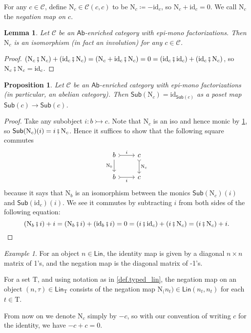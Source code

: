 \documentclass[11pt, oneside, article]{memoir}
\theoremstyle{plain}
\newtheorem{proposition}[theorem]{Proposition}
\newtheorem{lemma}[theorem]{Lemma}
\theoremstyle{definition}
\theoremstyle{remark}
\newtheorem{example}[theorem]{Example}
\newcommand{\Set}[1]{\mathrm{#1}}%
\newcommand{\cat}[1]{\mathcal{#1}}%
\newcommand{\Cat}[1]{{\mathsf{#1}}}%
\newcommand{\funn}[1]{\mathrm{#1}}%
\newcommand{\Funr}[1]{\mathsf{#1}}%
\newcommand{\ab}{\Cat{Ab}}
\newcommand{\sub}{\Funr{Sub}}
\newcommand{\id}{\funn{id}}
\newcommand{\Neg}[1]{\funn{N}_{#1}}
\newcommand{\cp}{\mathbin{\fatsemi}}
\newcommand{\inj}{\rightarrowtail}
\newcommand{\types}{\Set{T}}
\newcommand{\lin}{\Cat{Lin}}
\begin{document}
For any $c\in\cat{C}$, define $\Neg{c}\in\cat{C}(c,c)$ to be $\Neg{c}\coloneqq -\id_c$, so $\Neg{c}+\id_c=0$. We call $\Neg{c}$ the \emph{negation map on $c$}.

\begin{lemma}\label{lemma.neg_iso}
Let $\cat{C}$ be an $\ab$-enriched category with epi-mono factorizations. Then $\Neg{c}$ is an isomorphism (in fact an involution) for any $c\in\cat{C}$.
\end{lemma}
\begin{proof}
$(\Neg{c}\cp \Neg{c})+(\id_c\cp \Neg{c})=(\Neg{c}+\id_c\cp \Neg{c})=0=(\id_c\cp\id_c)+(\id_c\cp \Neg{c})$, so $\Neg{c}\cp \Neg{c}=\id_c$.
\end{proof}

\begin{proposition}\label{prop.sub_neg_trivial}
Let $\cat{C}$ be an $\ab$-enriched category with epi-mono factorizations (in particular, an abelian category). Then $\sub(\Neg{c})=\id_{\sub(c)}$ as a poset map $\sub(c)\to\sub(c)$.
\end{proposition}
\begin{proof}
Take any subobject $i\colon b\inj c$. Note that $\Neg{c}$ is an iso and hence monic by \cref{lemma.neg_iso}, so $\sub(\Neg{c})(i)=i\cp \Neg{c}$. Hence it suffices to show that the following square commutes
\[
\begin{tikzcd}
	b\ar[r, >->, "i"]\ar[d, "\Neg{b}"']&
	c\ar[d, >->, "\Neg{c}"]\\
	b\ar[r, >->, "i"']&
	c
\end{tikzcd}
\]
because it says that $\Neg{b}$ is an isomorphism between the monics $\sub(\Neg{c})(i)$ and $\sub(\id_c)(i)$. We see it commutes by subtracting $i$ from both sides of the following equation:
\[
  (\Neg{b}\cp i)+i=(\Neg{b}\cp i)+(\id_b\cp i)=0=(i\cp\id_c)+(i\cp \Neg{c})=(i\cp \Neg{c})+i.
\qedhere\]
\end{proof}

\begin{example}\label{ex.negation_lin}
For an object $n\in\lin$, the identity map is given by a diagonal $n\times n$ matrix of 1's, and the negation map is the diagonal matrix of -1's.

For a set $\types$, and using notation as in \cref{def.typed_lin}, the negation map on an object $(n,\tau)\in\lin_\types$ consists of the negation map $\Neg(n_t)\in\lin(n_t,n_t)$ for each $t\in\types$.
\end{example}

From now on we denote $\Neg{c}$ simply by $-c$, so with our convention of writing $c$ for the identity, we have $-c+c=0$.
\end{document}

